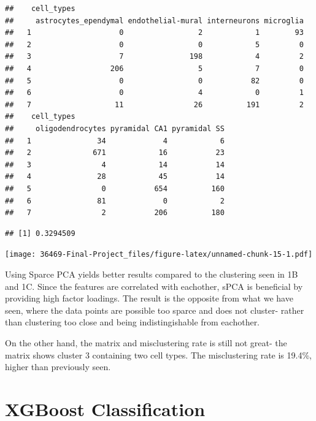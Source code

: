 \documentclass[]{article}
\newenvironment{Shaded}{\begin{snugshade}}{\end{snugshade}}
\newcommand{\KeywordTok}[1]{\textcolor[rgb]{0.13,0.29,0.53}{\textbf{#1}}}
\newcommand{\NormalTok}[1]{#1}
\newcommand{\OperatorTok}[1]{\textcolor[rgb]{0.81,0.36,0.00}{\textbf{#1}}}
\begin{document}
\begin{verbatim}
##    cell_types
##     astrocytes_ependymal endothelial-mural interneurons microglia
##   1                    0                 2            1        93
##   2                    0                 0            5         0
##   3                    7               198            4         2
##   4                  206                 5            7         0
##   5                    0                 0           82         0
##   6                    0                 4            0         1
##   7                   11                26          191         2
##    cell_types
##     oligodendrocytes pyramidal CA1 pyramidal SS
##   1               34             4            6
##   2              671            16           23
##   3                4            14           14
##   4               28            45           14
##   5                0           654          160
##   6               81             0            2
##   7                2           206          180
\end{verbatim}

\begin{Shaded}
\end{Shaded}

\begin{verbatim}
## [1] 0.3294509
\end{verbatim}

\texttt{[image: 36469-Final-Project\_files/figure-latex/unnamed-chunk-15-1.pdf]}

Using Sparce PCA yields better results compared to the clustering seen
in 1B and 1C. Since the features are correlated with eachother, sPCA is
beneficial by providing high factor loadings. The result is the opposite
from what we have seen, where the data points are possible too sparce
and does not cluster- rather than clustering too close and being
indistingishable from eachother.

On the other hand, the matrix and misclustering rate is still not great-
the matrix shows cluster 3 containing two cell types. The misclustering
rate is 19.4\%, higher than previously seen.

\hypertarget{xgboost-classification}{%
\section{XGBoost Classification}\label{xgboost-classification}}
\end{document}
